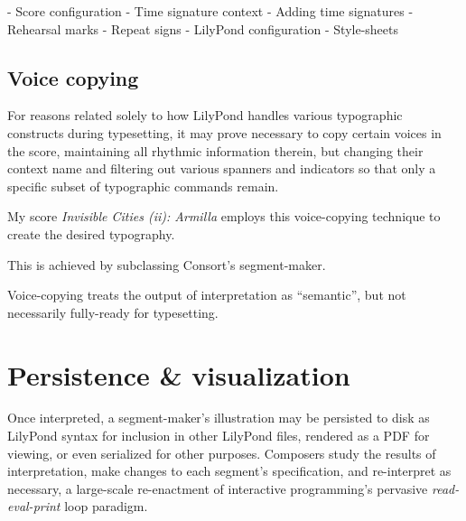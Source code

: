 \begin{markdown}
-   Score configuration
    -   Time signature context
        -   Adding time signatures
        -   Rehearsal marks
        -   Repeat signs
-   LilyPond configuration
    -   Style-sheets
\end{markdown}

\subsection{Voice copying}
\label{ssec:voice-copying}

For reasons related solely to how LilyPond handles various typographic
constructs during typesetting, it may prove necessary to copy certain voices in
the score, maintaining all rhythmic information therein, but changing their
context name and filtering out various spanners and indicators so that only a
specific subset of typographic commands remain.

My score \emph{Invisible Cities (ii): Armilla} employs this voice-copying
technique to create the desired typography.

This is achieved by subclassing Consort's segment-maker.

Voice-copying treats the output of interpretation as \enquote{semantic}, but
not necessarily fully-ready for typesetting.

\section{Persistence \& visualization}

Once interpreted, a segment-maker's illustration may be persisted to disk as
LilyPond syntax for inclusion in other LilyPond files, rendered as a PDF for
viewing, or even serialized for other purposes. Composers study the results of
interpretation, make changes to each segment's specification, and re-interpret
as necessary, a large-scale re-enactment of interactive programming's pervasive
\emph{read-eval-print} loop paradigm.